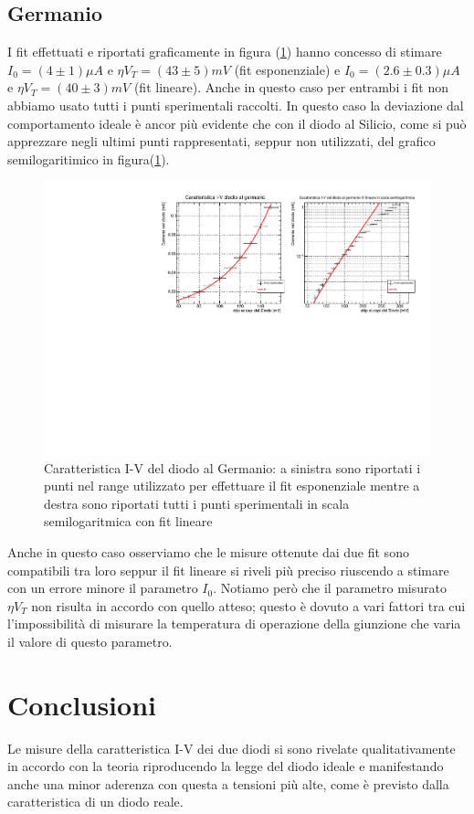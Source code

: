 \documentclass[]{article}
\begin{document}
\subsection{Germanio}
I fit effettuati e riportati graficamente in figura (\ref{fig:germanio}) hanno concesso di stimare $I_0=(4\pm1)\mu A$ e $\eta V_T=(43\pm5)mV$ (fit esponenziale) e $I_0=(2.6\pm0.3)\mu A$ e $\eta V_T=(40\pm3)mV$ (fit lineare). Anche in questo caso per entrambi i fit non abbiamo usato tutti i punti sperimentali raccolti. In questo caso la deviazione dal comportamento ideale è ancor più evidente che con il diodo al Silicio, come si può apprezzare negli ultimi punti rappresentati, seppur non utilizzati, del grafico semilogaritimico in figura(\ref{fig:germanio}).
\begin{figure}[H]
	\centering
	\includegraphics[width=0.9\linewidth]{../Germanio/canvas}
	\caption{Caratteristica I-V del diodo al Germanio: a sinistra sono riportati i punti nel range utilizzato per effettuare il fit esponenziale mentre a destra sono riportati tutti i punti sperimentali in scala semilogaritmica con fit lineare}
	\label{fig:germanio}
\end{figure}
Anche in questo caso osserviamo che le misure ottenute dai due fit sono compatibili tra loro seppur il fit lineare si riveli più preciso riuscendo a stimare con un errore minore il parametro $I_0$.
Notiamo però che il parametro misurato $\eta V_T$ non risulta in accordo con quello atteso; questo è dovuto a vari fattori tra cui l'impossibilità di misurare la temperatura di operazione della giunzione che varia il valore di questo parametro.
\section*{Conclusioni}
Le misure della caratteristica I-V dei due diodi si sono rivelate qualitativamente in accordo con la teoria riproducendo la legge del diodo ideale e manifestando anche una minor aderenza con questa a tensioni più alte, come è previsto dalla caratteristica di un diodo reale. 
\end{document}
